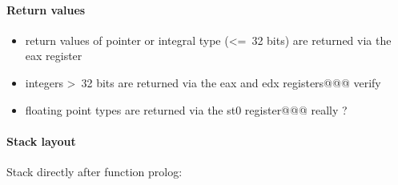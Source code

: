 \paragraph{Return values}

\begin{itemize}
\item return values of pointer or integral type (\textless=\ 32 bits) are returned via the eax register
\item integers \textgreater\ 32 bits are returned via the eax and edx registers@@@ verify
\item floating point types are returned via the st0 register@@@ really ?
\end{itemize}


\paragraph{Stack layout}

Stack directly after function prolog:\\

